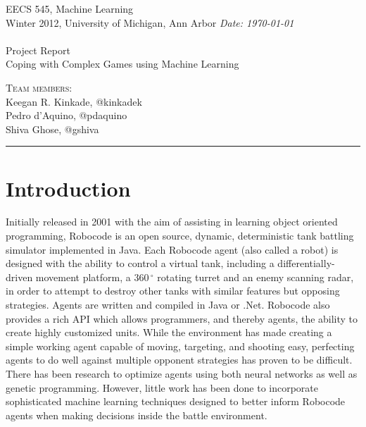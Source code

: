 \documentclass{article}
\newcommand{\shortbar}{\begin{center}\rule{5ex}{0.1pt}\end{center}}
\newcommand{\courseNumber}{EECS 545}
\newcommand{\courseTitle}{Machine Learning}
\newcommand{\semester}{Winter 2012}
\theoremstyle{plain}
\theoremstyle{definition}
\theoremstyle{remark}
\newenvironment{solution}[1]{\medskip\noindent{\bf Problem #1.~}}{\shortbar}
\newcommand{\solutions}[4]{
\vspace{-2ex}
\begin{center}
{\small  \courseNumber, \courseTitle
\hfill {\Large \bf {#1} }\\
\semester, University of Michigan, Ann Arbor \hfill
{\em Date: #3}}\\
\vspace{-1ex}
\hrulefill\\
\vspace{4ex}
{\normalsize Project Report}\\
{\LARGE  #2}\\
\vspace{2ex}
\end{center}
\begin{trivlist}
\item \textsc{Team members:} {#4}
\end{trivlist}
\noindent
\vspace{-1cm}
\shortbar
\vspace{-0.5cm}
}
\begin{document}
\solutions{}{Coping with Complex Games using Machine Learning}{\today}{\\ Keegan R. Kinkade, @kinkadek\\ Pedro d'Aquino, @pdaquino \\Shiva Ghose, @gshiva }
%
%

\begin{abstract}
Robocode\cite{robocode} is a battle-tank simulator in which agents compete among each other in a dynamic environment with the intention of destroying each other. Traditionally, most agents have been hand-coded. In this project, we create an agent that utilizes machine learning techniques to decide which actions to take. In particular, we use support vector machines to learn evasion and targeting strategies, with competitive results. We also implement Q-learning to learn targeting strategies, but with less success. We test our robot against some of the best Robocode robots available and present our results.
\end{abstract}

\section{Introduction}

Initially released in 2001 with the aim of assisting in learning object oriented programming, Robocode is an open source, dynamic, deterministic tank battling simulator implemented in Java. Each Robocode agent (also called a robot) is designed with the ability to control a virtual tank, including a differentially-driven movement platform, a $360\,^{\circ}\mathrm{}$ rotating turret and an enemy scanning radar, in order to attempt to destroy other tanks with similar features but opposing strategies. Agents are written and compiled in Java or .Net. Robocode also provides a rich API which allows programmers, and thereby agents, the ability to create highly customized units. While the environment has made creating a simple working agent capable of moving, targeting, and shooting easy, perfecting agents to do well against multiple opponent strategies has proven to be difficult. There has been research to optimize agents using both neural networks as well as genetic programming. However, little work has been done to incorporate sophisticated machine learning techniques designed to better inform Robocode agents when making decisions inside the battle environment.
\end{document}
